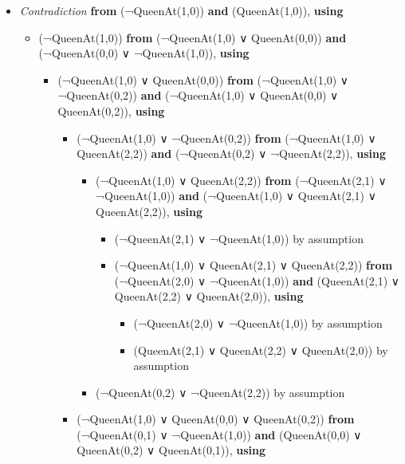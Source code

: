 \begin{itemize}
\tightlist
\item
  \emph{Contradiction} \textbf{from} (¬QueenAt(1,0)) \textbf{and}
  (QueenAt(1,0)), \textbf{using}

  \begin{itemize}
  \tightlist
  \item
    (¬QueenAt(1,0)) \textbf{from} (¬QueenAt(1,0) ∨ QueenAt(0,0))
    \textbf{and} (¬QueenAt(0,0) ∨ ¬QueenAt(1,0)), \textbf{using}

    \begin{itemize}
    \tightlist
    \item
      (¬QueenAt(1,0) ∨ QueenAt(0,0)) \textbf{from} (¬QueenAt(1,0) ∨
      ¬QueenAt(0,2)) \textbf{and} (¬QueenAt(1,0) ∨ QueenAt(0,0) ∨
      QueenAt(0,2)), \textbf{using}

      \begin{itemize}
      \tightlist
      \item
        (¬QueenAt(1,0) ∨ ¬QueenAt(0,2)) \textbf{from} (¬QueenAt(1,0) ∨
        QueenAt(2,2)) \textbf{and} (¬QueenAt(0,2) ∨ ¬QueenAt(2,2)),
        \textbf{using}

        \begin{itemize}
        \tightlist
        \item
          (¬QueenAt(1,0) ∨ QueenAt(2,2)) \textbf{from} (¬QueenAt(2,1) ∨
          ¬QueenAt(1,0)) \textbf{and} (¬QueenAt(1,0) ∨ QueenAt(2,1) ∨
          QueenAt(2,2)), \textbf{using}

          \begin{itemize}
          \tightlist
          \item
            (¬QueenAt(2,1) ∨ ¬QueenAt(1,0)) by assumption
          \item
            (¬QueenAt(1,0) ∨ QueenAt(2,1) ∨ QueenAt(2,2)) \textbf{from}
            (¬QueenAt(2,0) ∨ ¬QueenAt(1,0)) \textbf{and} (QueenAt(2,1) ∨
            QueenAt(2,2) ∨ QueenAt(2,0)), \textbf{using}

            \begin{itemize}
            \tightlist
            \item
              (¬QueenAt(2,0) ∨ ¬QueenAt(1,0)) by assumption
            \item
              (QueenAt(2,1) ∨ QueenAt(2,2) ∨ QueenAt(2,0)) by assumption
            \end{itemize}
          \end{itemize}
        \item
          (¬QueenAt(0,2) ∨ ¬QueenAt(2,2)) by assumption
        \end{itemize}
      \item
        (¬QueenAt(1,0) ∨ QueenAt(0,0) ∨ QueenAt(0,2)) \textbf{from}
        (¬QueenAt(0,1) ∨ ¬QueenAt(1,0)) \textbf{and} (QueenAt(0,0) ∨
        QueenAt(0,2) ∨ QueenAt(0,1)), \textbf{using}


\end{itemize}
\end{itemize}
\end{itemize}
\end{itemize}
